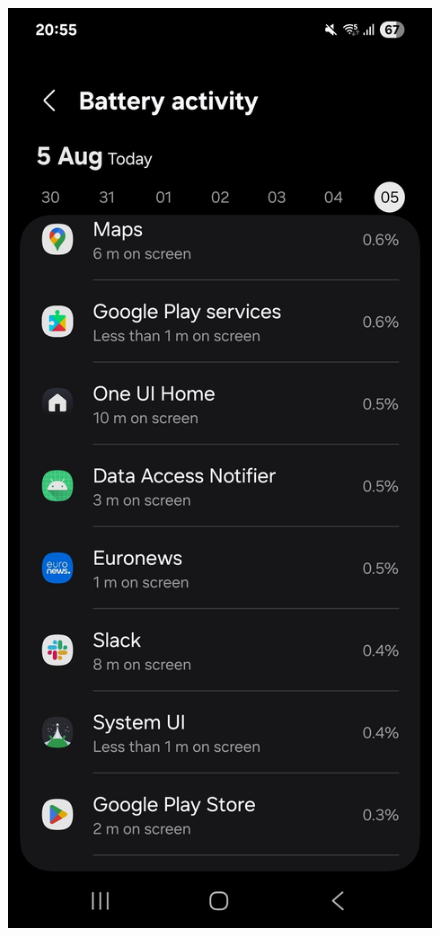 \begin{figure}[H]
\begin{minipage}{0.32\textwidth}
    \includegraphics[width=\textwidth]{english/figures/IMG_20250809_225839_242.jpg}

\end{minipage}
\end{figure}
